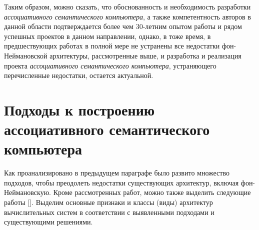 Таким образом, можно сказать, что обоснованность и необходимость разработки \textit{ассоциативного семантического компьютера}, а также компетентность авторов в данной области подтверждается более чем 30-летним опытом работы и рядом успешных проектов в данном направлении, однако, в тоже время, в предшествующих работах в полной мере не устранены все недостатки фон-Неймановской архитектуры, рассмотренные выше, и разработка и реализация проекта \textit{ассоциативного семантического компьютера}, устраняющего перечисленные недостатки, остается актуальной.

\section{Подходы к построению ассоциативного семантического компьютера}
Как проанализировано в предыдущем параграфе было развито множество подходов, чтобы преодолеть недостатки существующих архитектур, включая фон-Неймановскую. Кроме рассмотренных работ, можно также выделить следующие работы [].
Выделим основные признаки и классы (виды) архитектур вычислительных систем в соответствии с выявленными подходами и существующими решениями.
